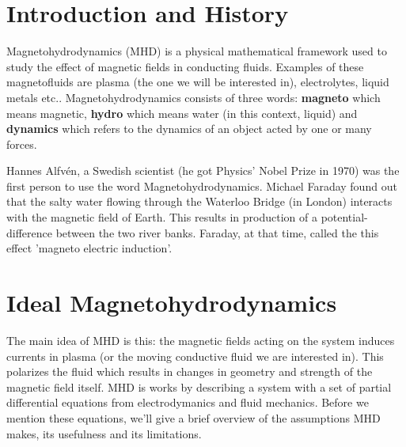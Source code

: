 \documentclass[12pt]{article}
\newenvironment{changemargin}[2]{
\begin{list}{}{
\setlength{\topsep}{0pt}
\setlength{\leftmargin}{#1}
\setlength{\rightmargin}{#2}
\setlength{\listparindent}{\parindent}
\setlength{\itemindent}{\parindent}
\setlength{\parsep}{\parskip}
}
\item[]}{\end{list}}
\begin{document}
\begin{changemargin}{-2cm}{-2cm}
    \section{Introduction and History}
    Magnetohydrodynamics (MHD) is a physical mathematical framework used to study the effect of magnetic fields in conducting fluids. Examples of these magnetofluids are plasma (the one we will be interested in), electrolytes, liquid metals etc.. Magnetohydrodynamics consists of three words: \textbf{magneto} which means magnetic, \textbf{hydro} which means water (in this context, liquid) and \textbf{dynamics} which refers to the dynamics of an object acted by one or many forces.\cite{sd-mhd}\cite{scholar-mhd}

    Hannes Alfvén, a Swedish scientist (he got Physics' Nobel Prize in 1970) was the first person to use the word Magnetohydrodynamics.\cite{first-mhd}  Michael Faraday found out that the salty water flowing through the Waterloo Bridge (in London) interacts with the magnetic field of Earth. This results in production of a potential-difference between the two river banks. Faraday, at that time, called the this effect 'magneto electric induction'.\cite{wiki-mhd}

    \section{Ideal Magnetohydrodynamics}

    The main idea of MHD is this: the magnetic fields acting on the system induces currents in plasma (or the moving conductive fluid we are interested in). This polarizes the fluid which results in changes in geometry and strength of the magnetic field itself. MHD is works by describing a system with a set of partial differential equations from electrodymanics and fluid mechanics. Before we mention these equations, we'll give a brief overview of the assumptions MHD makes, its usefulness and its limitations.


\end{changemargin}
\end{document}
